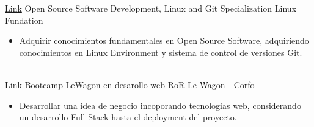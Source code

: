 \documentclass[letterpaper]{DS_class_file} %
\begin{document}
\begin{twenty}
\twentyitem
{\href{https://www.coursera.org/specializations/oss-development-linux-git}{Link}}
{}
{\hspace{0.3cm}Open Source Software Development, Linux and Git Specialization}
{Linux Fundation}
{}
{
	{\begin{itemize}
			\item Adquirir conocimientos fundamentales en Open Source Software, adquiriendo conocimientos en Linux Environment y sistema de control de versiones Git.
	\end{itemize}}
}
	\\
	\twentyitem
	{\href{https://www.coursera.org/specializations/oss-development-linux-git}{Link}}
	{}
	{\hspace{0.3cm}Bootcamp LeWagon en desarollo web RoR}
	{Le Wagon - Corfo}
	{}
	{
		{\begin{itemize}
				\item Desarrollar una idea de negocio incoporando tecnologias web,  considerando un desarrollo Full Stack  hasta el deployment del proyecto. 
		\end{itemize}}
	}

	
\end{twenty}



	
\end{document}
